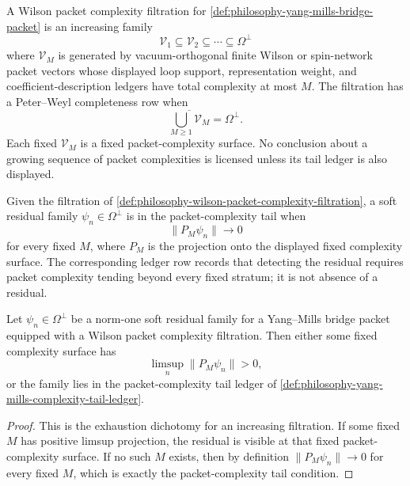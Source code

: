 \begin{definition}
\label{def:philosophy-wilson-packet-complexity-filtration}
A Wilson packet complexity filtration for
\autoref{def:philosophy-yang-mills-bridge-packet} is an increasing family
$$
\mathcal V_1\subseteq \mathcal V_2\subseteq\cdots\subseteq\Omega^{\perp}
$$
where $\mathcal V_M$ is generated by vacuum-orthogonal finite Wilson or
spin-network packet vectors whose displayed loop support, representation
weight, and coefficient-description ledgers have total complexity at most
$M$. The filtration has a Peter--Weyl completeness row when
$$
\overline{\bigcup_{M\ge1}\mathcal V_M}=\Omega^{\perp}.
$$
Each fixed $\mathcal V_M$ is a fixed packet-complexity surface. No conclusion
about a growing sequence of packet complexities is licensed unless its tail
ledger is also displayed.
\end{definition}

\begin{definition}
\label{def:philosophy-yang-mills-complexity-tail-ledger}
Given the filtration of
\autoref{def:philosophy-wilson-packet-complexity-filtration}, a soft
residual family $\psi_n\in\Omega^{\perp}$ is in the packet-complexity tail
when
$$
\|P_M\psi_n\|\to0
$$
for every fixed $M$, where $P_M$ is the projection onto the displayed fixed
complexity surface. The corresponding ledger row records that detecting the
residual requires packet complexity tending beyond every fixed stratum; it is
not absence of a residual.
\end{definition}

\begin{theorem}
\label{thm:philosophy-soft-residual-fixed-packet-complexity-tail}
Let $\psi_n\in\Omega^{\perp}$ be a norm-one soft residual family for a
Yang--Mills bridge packet equipped with a Wilson packet complexity
filtration. Then either some fixed complexity surface has
$$
\limsup_n\|P_M\psi_n\|>0,
$$
or the family lies in the packet-complexity tail ledger of
\autoref{def:philosophy-yang-mills-complexity-tail-ledger}.
\end{theorem}
\begin{proof}
This is the exhaustion dichotomy for an increasing filtration. If some
fixed $M$ has positive limsup projection, the residual is visible at that
fixed packet-complexity surface. If no such $M$ exists, then by definition
$\|P_M\psi_n\|\to0$ for every fixed $M$, which is exactly the
packet-complexity tail condition.
\end{proof}

